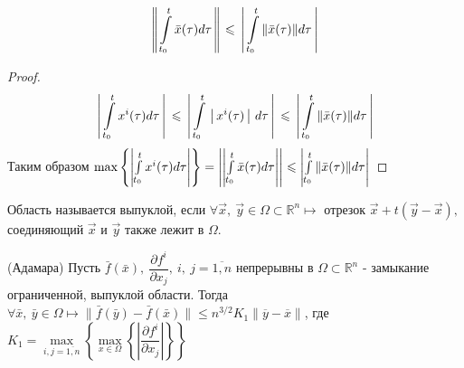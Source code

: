 \begin{lemma}
    \[
    \left\Arrowvert \int\limits_{t_0}^t\bar{x}(\tau)d\tau \right\Arrowvert \leqslant \left\arrowvert \int\limits_{t_0}^t \Arrowvert \bar{x}(\tau)\Arrowvert d\tau \right\arrowvert
    \]
\end{lemma}

\begin{proof}
    \begin{equation}
        \left\arrowvert \int\limits_{t_0}^t x^i(\tau)d\tau \right\arrowvert \leqslant\left\arrowvert \int\limits_{t_0}^t \left\arrowvert x^i(\tau) \right\arrowvert d\tau\right\arrowvert \leqslant \left\arrowvert \int\limits_{t_0}^t \Arrowvert \bar{x}(\tau)\Arrowvert d\tau \right\arrowvert
    \end{equation}
    Таким образом $\max\left\{\left|\int\limits_{t_0}^t x^i(\tau)d\tau\right|\right\} = \left|
    \left| \int\limits_{t_0}^t \bar{x}(\tau)d\tau \right|\right| \leqslant \left| \int\limits_{t_0}^t \Arrowvert \bar{x}(\tau)\Arrowvert d\tau \right|$
\end{proof}

\begin{definition}
Область называется выпуклой, если $\forall \vec{x},~ \vec{y} \in \Omega \subset \mathbb{R}^n \mapsto$ отрезок $\vec{x} + t(\vec{y} - \vec{x}), $ соединяющий $\vec{x}$ и $\vec{y}$ также лежит в $\Omega$.
\end{definition}

\begin{lemma} (Адамара)
    Пусть $\bar{f}(\bar{x}),~ \dfrac{\partial f^i}{\partial x_j},~ i,~j = \overline{1, n}$ непрерывны в $\Omega \subset \mathbb{R}^n $ - замыкание ограниченной, выпуклой области. Тогда $\forall \bar{x},~\bar{y} \in \Omega  \longmapsto \| \bar{f}(\bar{y}) - \bar{f}(\bar{x}) \| \leqslant n^{3/2}K_1\|\overline{y} - \overline{x}\|$, где $K_1 = \max\limits_{i,j=\overline{1,n}} \left\{\max\limits_{x\in\Omega}\left\{\left|\dfrac{\partial f^i}{\partial x_j}\right|\right\} \right\}$
\end{lemma}

